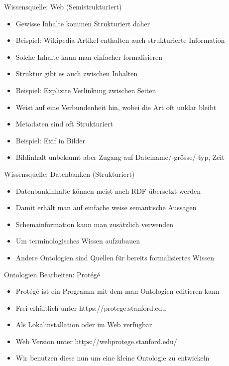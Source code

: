 \documentclass{beamer}
\begin{document}
\begin{frame}{Wissensquelle: Web (Semistrukturiert)}
	
	\begin{itemize}
		\item Gewisse Inhalte kommen Strukturiert daher
		\item Beispiel: Wikipedia Artikel enthalten auch strukturierte Information
		\item Solche Inhalte kann man einfacher formalisieren
		\item Struktur gibt es auch zwischen Inhalten
		\item Beispiel: Explizite Verlinkung zwischen Seiten
		\item Weist auf eine Verbundenheit hin, wobei die Art oft unklar bleibt
		\item Metadaten sind oft Strukturiert
		\item Beispiel: Exif in Bilder
		\item Bildinhalt unbekannt aber Zugang auf Dateiname/-grösse/-typ, Zeit
	\end{itemize}
	
\end{frame}

\begin{frame}{Wissensquelle: Datenbanken (Strukturiert)}
	
	\begin{itemize}
		\item Datenbankinhalte können meist nach RDF übersetzt werden
		\item Damit erhält man auf einfache weise semantische Aussagen
		\item Schemainformation kann man zusätzlich verwenden
		\item Um terminologisches Wissen aufzubauen
		\item Andere Ontologien sind Quellen für bereits formalisiertes Wissen
	\end{itemize}
	
\end{frame}

\begin{frame}{Ontologien Bearbeiten: Prot{\'e}g{\'e}}
	
	\begin{itemize}
		\item Prot{\'e}g{\'e} ist ein Programm mit dem man Ontologien editieren kann
		\item Frei erhältlich unter https://protege.stanford.edu
		\item Als Lokalinstallation oder im Web verfügbar
		\item Web Version unter https://webprotege.stanford.edu/
		\item Wir benutzen diese nun um eine kleine Ontologie zu entwickeln
	\end{itemize}
	
\end{frame}
\end{document}
